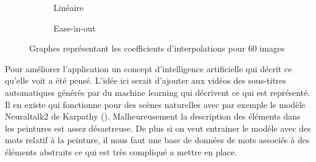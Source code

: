 \begin{figure}[ht]
    \centering
    \begin{subfigure}{.49\textwidth}
        \centering
        \caption{Linéaire}
        \label{subfig:lineaire}
    \end{subfigure}
    \begin{subfigure}{.49\textwidth}
        \centering
        \caption{Ease-in-out}
        \label{subfig:ease}
    \end{subfigure}
    \caption{Graphes représentant les coefficients d'interpolations pour 60 images}
    \label{fig:graphes}
\end{figure}


\par
Pour améliorer l'application un concept d'intelligence artificielle qui décrit ce qu'elle voit a été pensé. L'idée ici serait d'ajouter aux vidéos des sous-titres automatiques générés par du machine learning qui décrivent ce qui est représenté. Il en existe qui fonctionne pour des scènes naturelles avec par exemple le modèle Neuraltalk2 de Karpathy (). Malheureusement la description des éléments dans les peintures est assez désastreuse. De plus si on veut entrainer le modèle avec des mots relatif à la peinture, il nous faut une base de données de mots associés à des éléments abstraits ce qui est très compliqué a mettre en place.